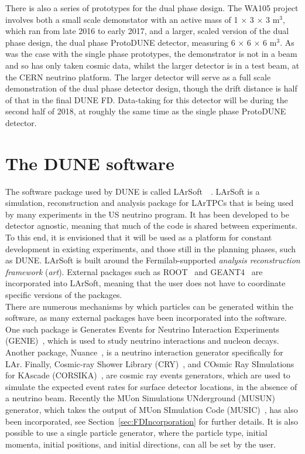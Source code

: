 There is also a series of prototypes for the dual phase design. The WA105 project involves both a small scale demonstator with an active mass of 1 $\times$ 3 $\times$ 3 m$^3$, which ran from late 2016 to early 2017, and a larger, scaled version of the dual phase design, the dual phase ProtoDUNE detector, measuring 6 $\times$ 6 $\times$ 6 m$^3$. As was the case with the single phase prototypes, the demonstrator is not in a beam and so has only taken cosmic data, whilst the larger detector is in a test beam, at the CERN neutrino platform. The larger detector will serve as a full scale demonstration of the dual phase detector design, though the drift distance is half of that in the final DUNE FD. Data-taking for this detector will be during the second half of 2018, at roughly the same time as the single phase ProtoDUNE detector. \\

\section{The DUNE software} \label{sec:LArSoft} %
The software package used by DUNE is called LArSoft~\citep{Church_LArSoft}~\citep{LArSoftOrg}. LArSoft is a simulation, reconstruction and analysis package for LArTPCs that is being used by many experiments in the US neutrino program. It has been developed to be detector agnostic, meaning that much of the code is shared between experiments. To this end, it is envisioned that it will be used as a platform for constant development in existing experiments, and those still in the planning phases, such as DUNE. LArSoft is built around the Fermilab-supported \emph{analysis reconstruction framework} (\emph{art}). External packages such as ROOT~\citep{ROOT} and GEANT4~\citep{GEANT4} are incorporated into LArSoft, meaning that the user does not have to coordinate specific versions of the packages. \\

There are numerous mechanisms by which particles can be generated within the software, as many external packages have been incorporated into the software. One such package is Generates Events for Neutrino Interaction Experiments (GENIE)~\citep{GENIE}, which is used to study neutrino interactions and nucleon decays. Another package, Nuance~\citep{Nuance}, is a neutrino interaction generator specifically for LAr. Finally, Cosmic-ray Shower Library (CRY)~\citep{CRY,CRY2}, and COsmic Ray SImulations for KAscade (CORSIKA)~\citep{CORSIKA}, are cosmic ray events generators, which are used to simulate the expected event rates for surface detector locations, in the absence of a neutrino beam. Recently the MUon Simulations UNderground (MUSUN)~\citep{MUSUN, MUSUN2} generator, which takes the output of MUon SImulation Code (MUSIC)~\citep{MUSUN, MUSIC, MUSIC2}, has also been incorporated, see Section~\ref{sec:FDIncorporation} for further details. It is also possible to use a single particle generator, where the particle type, initial momenta, initial positions, and initial directions, can all be set by the user. \\

